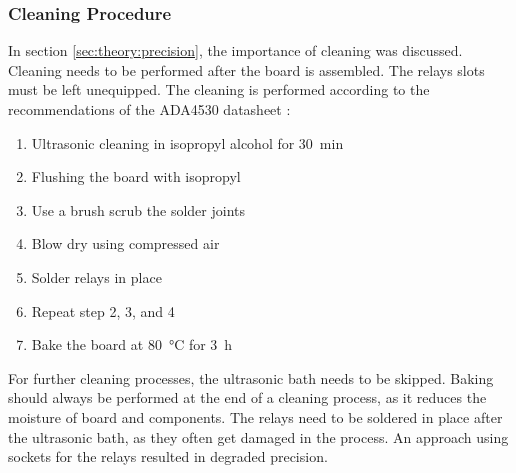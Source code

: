 \subsubsection*{Cleaning Procedure}
In section \ref{sec:theory:precision}, the importance of cleaning was discussed. Cleaning needs to be performed after the board is assembled. The relays slots must be left unequipped. The cleaning is performed according to the recommendations of the ADA4530 datasheet \cite{ADA4530}:
\begin{enumerate}
	\item Ultrasonic cleaning in isopropyl alcohol for \SI{30}{\minute}
	\item Flushing the board with isopropyl 
	\item Use a brush scrub the solder joints 
	\item Blow dry using compressed air
	\item Solder relays in place
	\item Repeat step 2, 3, and 4
	\item Bake the board at \SI{80}{\degreeCelsius} for \SI{3}{\hour}
\end{enumerate}
For further cleaning processes, the ultrasonic bath needs to be skipped. Baking should always be performed at the end of a cleaning process, as it reduces the moisture of board and components.
The relays need to be soldered in place after the ultrasonic bath, as they often get damaged in the process. An approach using sockets for the relays resulted in degraded precision.
